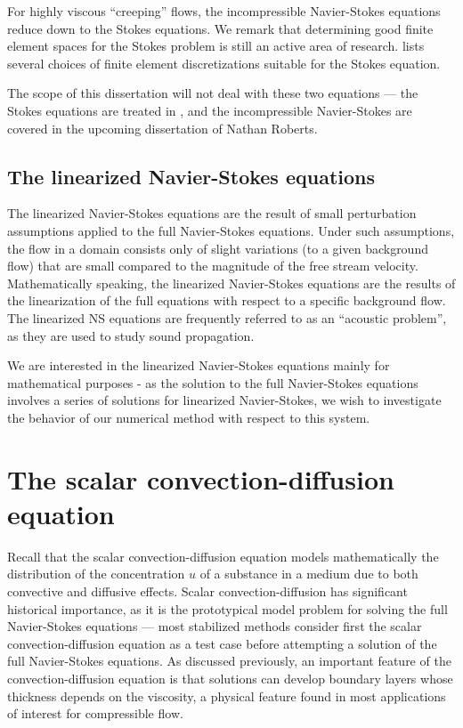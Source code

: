 For highly viscous ``creeping'' flows, the incompressible Navier-Stokes equations reduce down to the Stokes equations. We remark that determining good finite element spaces for the Stokes problem is still an active area of research. \cite{stokesFEM} lists several choices of finite element discretizations suitable for the Stokes equation. 

The scope of this dissertation will not deal with these two equations --- the Stokes equations are treated in \cite{stokesDPG}, and the incompressible Navier-Stokes are covered in the upcoming dissertation of Nathan Roberts.  

\subsection{The linearized Navier-Stokes equations}

The linearized Navier-Stokes equations are the result of small perturbation assumptions applied to the full Navier-Stokes equations. Under such assumptions, the flow in a domain consists only of slight variations (to a given background flow) that are small compared to the magnitude of the free stream velocity.  Mathematically speaking, the linearized Navier-Stokes equations are the results of the linearization of the full equations with respect to a specific background flow.  The linearized NS equations are frequently referred to as an ``acoustic problem'', as they are used to study sound propagation.  

We are interested in the linearized Navier-Stokes equations mainly for mathematical purposes - as the solution to the full Navier-Stokes equations involves a series of solutions for linearized Navier-Stokes, we wish to investigate the behavior of our numerical method with respect to this system.  

\section{The scalar convection-diffusion equation}

Recall that the scalar convection-diffusion equation models mathematically the distribution of the concentration $u$ of a substance in a medium due to both convective and diffusive effects. 
Scalar convection-diffusion has significant historical importance, as it is the prototypical model problem for solving the full Navier-Stokes equations --- most stabilized methods consider first the scalar convection-diffusion equation as a test case before attempting a solution of the full Navier-Stokes equations. As discussed previously, an important feature of the convection-diffusion equation is that solutions can develop boundary layers whose thickness depends on the viscosity, a physical feature found in most applications of interest for compressible flow. 

